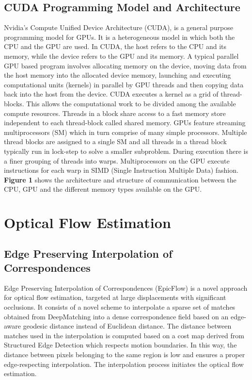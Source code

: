 \documentclass[english]{article}
\begin{document}
	\subsection{CUDA Programming Model and Architecture}
	Nvidia’s Compute Unified Device Architecture (CUDA), is a general purpose programming model for GPUs. It is a heterogeneous model in which both the CPU and the GPU are used. In CUDA, the host refers to the CPU and its memory, while the device refers to the GPU and its memory. A typical parallel GPU based program involves allocating memory on the device, moving data from the host memory into the allocated device memory, launching and executing computational units (kernels) in parallel by GPU threads and then copying data back into the host from the device. CUDA executes a kernel as a grid of thread-blocks. This allows the computational work to be divided among the available compute resources. Threads in a block share access to a fast memory store independent to each thread-block called shared memory. GPUs feature streaming multiprocessors (SM) which in turn comprise of many simple processors. Multiple thread blocks are assigned to a single SM and all threads in a thread block typically run in lock-step to solve a smaller subproblem. During execution there is a finer grouping of threads into warps. Multiprocessors on the GPU execute instructions for each warp in SIMD (Single Instruction Multiple Data) fashion. \textbf{Figure 1} shows the architecture and structure of communication between the CPU, GPU and the different memory types available on the GPU.

	\section{Optical Flow Estimation}
	\subsection{Edge Preserving Interpolation of Correspondences}
	Edge Preserving Interpolation of Correspondences (EpicFlow) \cite{1} is a novel approach for optical flow estimation, targeted at large displacements with significant occlusions. It consists of a novel scheme to interpolate a sparse set of matches obtained from DeepMatching \cite{3} into a dense correspondence field based on an edge-aware geodesic distance instead of Euclidean distance. The distance between matches used in the interpolation is computed based on a cost map derived from Structured Edge Detection \cite{4} which respects motion boundaries. In this way, the distance between pixels belonging to the same region is low and ensures a proper edge-respecting interpolation. The interpolation process initiates the optical flow estimation.
\end{document}
